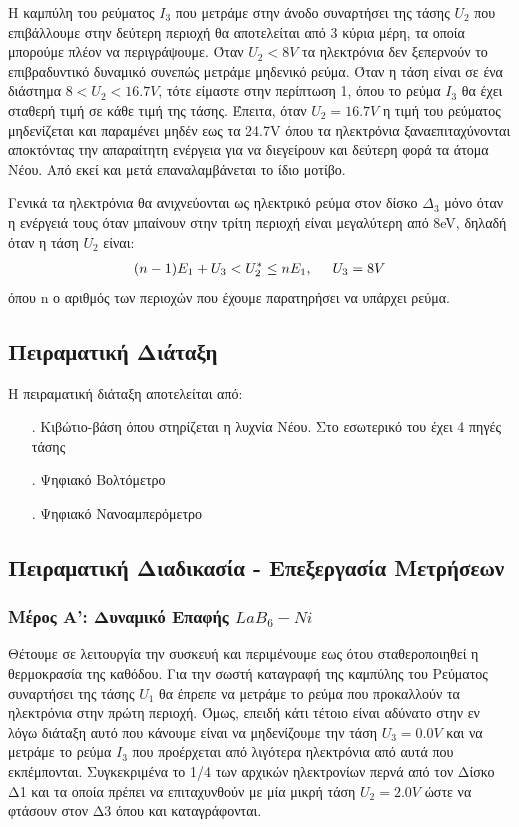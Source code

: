 \documentclass[a4paper]{article}
\begin{document}
	Η καμπύλη του ρεύματος $I_3$ που μετράμε στην άνοδο συναρτήσει της τάσης $U_2$ που επιβάλλουμε στην δεύτερη περιοχή θα αποτελείται από 3 κύρια μέρη, τα οποία μπορούμε πλέον να περιγράψουμε. Όταν \textit{$U_2<8V$} τα ηλεκτρόνια δεν ξεπερνούν το επιβραδυντικό δυναμικό συνεπώς μετράμε μηδενικό ρεύμα. Όταν η τάση είναι σε ένα διάστημα $8<U_2<16.7V$, τότε είμαστε στην περίπτωση 1, όπου το ρεύμα $I_3$ θα έχει σταθερή τιμή σε κάθε τιμή της τάσης. Έπειτα, όταν $U_2=16.7V$ η τιμή του ρεύματος μηδενίζεται και παραμένει μηδέν εως τα 24.7V όπου τα ηλεκτρόνια ξαναεπιταχύνονται αποκτόντας την απαραίτητη ενέργεια για να διεγείρουν και δεύτερη φορά τα άτομα Νέου. Από εκεί και μετά επαναλαμβάνεται το ίδιο μοτίβο. 
	
	Γενικά τα ηλεκτρόνια θα ανιχνεύονται ως ηλεκτρικό ρεύμα στον δίσκο $\Delta_3$ μόνο όταν η ενέργειά τους όταν μπαίνουν στην τρίτη περιοχή είναι μεγαλύτερη από 8eV, δηλαδή όταν η τάση $U_2$ είναι: 
		\begin{align}\label{eq3}
			(n-1)E_1+U_3 < U_2^* \leq nE_1 , \hspace{0.5cm} \text{$U_3=8V$}
		\end{align}
		όπου n ο αριθμός των περιοχών που έχουμε παρατηρήσει να υπάρχει ρεύμα.
		
		
	\subsection*{Πειραματική Διάταξη}
		Η πειραματική διάταξη αποτελείται από: 
			\begin{itemize}
				\item[.] Κιβώτιο-βάση όπου στηρίζεται η λυχνία Νέου. Στο εσωτερικό του έχει 4 πηγές τάσης 
				\item[.] Ψηφιακό Βολτόμετρο
				\item[.] Ψηφιακό Νανοαμπερόμετρο
\end{itemize}				
	
	\subsection*{Πειραματική Διαδικασία - Επεξεργασία Μετρήσεων}
	
	\subsubsection*{Μέρος Α': Δυναμικό Επαφής $LaB_6-Ni$}
	 	
	 	Θέτουμε σε λειτουργία την συσκευή και περιμένουμε εως ότου σταθεροποιηθεί η θερμοκρασία της καθόδου. Για την σωστή καταγραφή της καμπύλης του Ρεύματος συναρτήσει της τάσης $U_1$ θα έπρεπε να μετράμε το ρεύμα που προκαλλούν τα ηλεκτρόνια στην πρώτη περιοχή. Όμως, επειδή κάτι τέτοιο είναι αδύνατο στην εν λόγω διάταξη αυτό που κάνουμε είναι να μηδενίζουμε την τάση $U_3=0.0V$ και να μετράμε το ρεύμα $I_3$ που προέρχεται από λιγότερα ηλεκτρόνια από αυτά που εκπέμπονται. Συγκεκριμένα το 1/4 των αρχικών ηλεκτρονίων περνά από τον Δίσκο Δ1 και τα οποία πρέπει να επιταχυνθούν με μία μικρή τάση $U_2=2.0V$ ώστε να φτάσουν στον Δ3 όπου και καταγράφονται.
	 	
\end{document}
